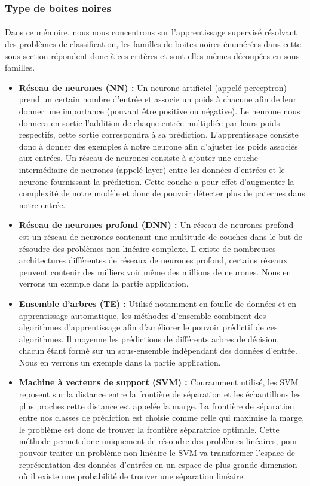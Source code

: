 \subsubsection{Type de boites noires}
\paragraph{}Dans ce mémoire, nous nous concentrons sur l'apprentissage supervisé résolvant des problèmes de classification, les familles de boites noires énumérées dans cette sous-section répondent donc à ces critères et sont elles-mêmes découpées en sous-familles.
\begin{itemize}
    \item \textbf{Réseau de neurones (NN) :} Un neurone artificiel (appelé perceptron) prend un certain nombre d'entrée et associe un poids à chacune afin de leur donner une importance (pouvant être positive ou négative). Le neurone nous donnera en sortie l'addition de chaque entrée multipliée par leurs poids respectifs, cette sortie correspondra à sa prédiction. L'apprentissage consiste donc à donner des exemples à notre neurone afin d'ajuster les poids associés aux entrées. Un réseau de neurones consiste à ajouter une couche intermédiaire de neurones (appelé layer) entre les données d'entrées et le neurone fournissant la prédiction. Cette couche a pour effet d'augmenter la complexité de notre modèle et donc de pouvoir détecter plus de paternes dans notre entrée.
    
    \item \textbf{Réseau de neurones profond (DNN) :} Un réseau de neurones profond est un réseau de neurones contenant une multitude de couches dans le but de résoudre des problèmes non-linéaire complexe. Il existe de nombreuses architectures différentes de réseaux de neurones profond, certains réseaux peuvent contenir des milliers voir même des millions de neurones. Nous en verrons un exemple dans la partie application.
    
    \item \textbf{Ensemble d'arbres (TE) :} Utilisé notamment en fouille de données et en apprentissage automatique, les méthodes d'ensemble combinent des algorithmes d'apprentissage afin d'améliorer le pouvoir prédictif de ces algorithmes. Il moyenne les prédictions de différents arbres de décision, chacun étant formé sur un sous-ensemble indépendant des données d'entrée. Nous en verrons un exemple dans la partie application.
    
    \item \textbf{Machine à vecteurs de support (SVM) :} Couramment utilisé, les SVM reposent sur la distance entre la frontière de séparation et les échantillons les plus proches cette distance est appelée la marge. La frontière de séparation entre nos classes de prédiction est choisie comme celle qui maximise la marge, le problème est donc de trouver la frontière séparatrice optimale. Cette méthode permet donc uniquement de résoudre des problèmes linéaires, pour pouvoir traiter un problème non-linéaire le SVM va transformer l'espace de représentation des données d'entrées en un espace de plus grande dimension où il existe une probabilité de trouver une séparation linéaire.
\end{itemize}

